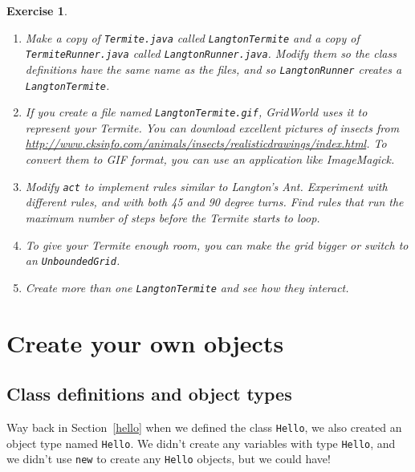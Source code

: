 \documentclass[12pt]{book}
\theoremstyle{exercise}
\newtheorem{exercise}{Exercise}[chapter]
\begin{document}
\begin{exercise}

\begin{enumerate}

\item Make a copy of {\tt Termite.java} called {\tt LangtonTermite}
and a copy of {\tt TermiteRunner.java} called {\tt LangtonRunner.java}.
Modify them so the class definitions have the same name as the files,
and so {\tt LangtonRunner} creates a {\tt LangtonTermite}.

\item If you create a file named {\tt LangtonTermite.gif}, GridWorld
  uses it to represent your Termite.  You can download excellent
  pictures of insects from
  \url{http://www.cksinfo.com/animals/insects/realisticdrawings/index.html}.
  To convert them to GIF format, you can use an application like
  ImageMagick.

\item Modify {\tt act} to implement rules similar to Langton's Ant.
Experiment with different rules, and with both 45 and 90 degree turns.
Find rules that run the maximum number of steps before the Termite
starts to loop.

\item To give your Termite enough room, you can make the grid
bigger or switch to an {\tt UnboundedGrid}.

\item Create more than one {\tt LangtonTermite} and see how they
interact.

\end{enumerate}

\end{exercise}


\chapter{Create your own objects}
\label{chap09}

\section{Class definitions and object types}
\label{classes}

Way back in
Section~\ref{hello} when we defined the class {\tt Hello},
we also created an object type named {\tt Hello}.  We
didn't create any variables with type {\tt Hello}, and we
didn't use {\tt new} to create any {\tt Hello}
objects, but we could have!
\end{document}
